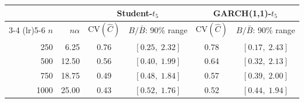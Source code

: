 \begin{tabular}{r r cc cc}
\toprule
& & \multicolumn{2}{c}{Student-$t_5$}
& \multicolumn{2}{c}{GARCH(1,1)-$t_5$} \\
\cmidrule(lr){3-4} \cmidrule(lr){5-6}
$n$ & $n\alpha$ & CV$(\hat{C})$ & $B/\bar{B}$: 90\% range
& CV$(\hat{C})$ & $B/\bar{B}$: 90\% range \\
\midrule
 250 &  6.25 & 0.76 & $[0.25,\;2.32]$ & 0.78 & $[0.17,\;2.43]$ \\
 500 & 12.50 & 0.56 & $[0.40,\;1.99]$ & 0.64 & $[0.32,\;2.13]$ \\
 750 & 18.75 & 0.49 & $[0.48,\;1.84]$ & 0.57 & $[0.39,\;2.00]$ \\
1000 & 25.00 & 0.43 & $[0.52,\;1.76]$ & 0.52 & $[0.44,\;1.94]$ \\
\bottomrule
\end{tabular}